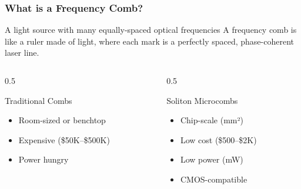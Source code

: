 \documentclass{beamer}
\begin{document}
\begin{frame}
    \frametitle{What is a Frequency Comb?}
    
    \begin{block}{A light source with many equally-spaced optical frequencies}
        A frequency comb is like a ruler made of light, where each mark is a perfectly spaced, phase-coherent laser line.
    \end{block}
    
    \begin{columns}[T]
        \begin{column}{0.5\textwidth}
            \begin{alertblock}{Traditional Combs}
                \begin{itemize}
                    \item Room-sized or benchtop
                    \item Expensive (\$50K--\$500K)
                    \item Power hungry
                \end{itemize}
            \end{alertblock}
        \end{column}
        \begin{column}{0.5\textwidth}
            \begin{block}{Soliton Microcombs}
                \begin{itemize}
                    \item Chip-scale (mm²)
                    \item Low cost (\$500--\$2K)
                    \item Low power (mW)
                    \item CMOS-compatible
                \end{itemize}
            \end{block}
        \end{column}
    \end{columns}
\end{frame}
\end{document}
